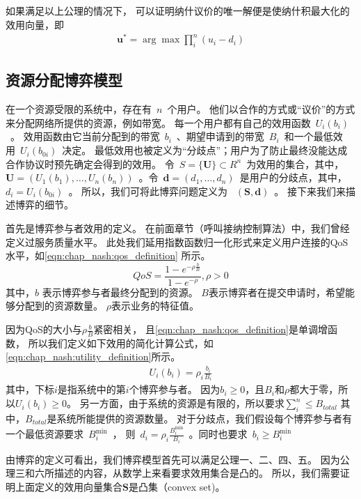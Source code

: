 如果满足以上公理的情况下，
可以证明纳什议价的唯一解便是使纳什积最大化的效用向量\cite{Nash_1950}，即
\begin{align}
\mathbf{u}^* = \arg \max \prod_i^n (u_i-d_i)
\label{eqn:chap_nash:nash_product}
\end{align}

\subsection{资源分配博弈模型}
在一个资源受限的系统中，存在有~$n$~个用户。
他们以合作的方式或“议价”的方式来分配网络所提供的资源，例如带宽。
每一个用户都有自己的效用函数~$U_i(b_i)$~。
效用函数由它当前分配到的带宽~$b_i$~、期望申请到的带宽~$B_i$~和一个最低效用~$U_i(b_{0i})$~决定。
最低效用也被定义为“分歧点”；用户为了防止最终没能达成合作协议时预先确定会得到的效用。
令~$S = \{ \mathbf{U} \} \subset R^n$~为效用的集合，其中，~$\mathbf{U} =(U_1(b_1), \ldots, U_n(b_n))$~。令~$\mathbf{d} = (d_1, \ldots, d_n)$~是用户的分歧点，其中，~$d_i = U_i(b_{0i})$~。
所以，我们可将此博弈问题定义为 ~$(\mathbf{S,d})$~。
接下来我们来描述博弈的细节。

首先是博弈参与者效用的定义。
在前面章节（呼叫接纳控制算法）中，我们曾经定义过服务质量水平。
此处我们延用指数函数归一化形式来定义用户连接的QoS水平，如\eqref{eqn:chap_nash:qos_definition} 所示。
\begin{equation}
QoS = \frac{1- e^{-\rho \frac{b}{B} }}{1-e^{-\rho}}, \rho > 0
\label{eqn:chap_nash:qos_definition}
\end{equation}
其中，$b$ 表示博弈参与者最终分配到的资源。
$B$表示博弈者在提交申请时，希望能够分配到的资源数量。
$\rho$表示业务的特征值。

因为QoS的大小与$\rho \frac{b}{B}$紧密相关，
且\eqref{eqn:chap_nash:qos_definition}是单调增函数，
所以我们定义如下效用的简化计算公式，如 \eqref{eqn:chap_nash:utility_definition}所示。
\begin{align}
    U_i(b_i) = \rho_i \frac{b_i}{B_i}
    \label{eqn:chap_nash:utility_definition}
\end{align}
其中，下标$i$是指系统中的第$i$个博弈参与者。
因为$b_i\ge 0$，且$B_i$和$\rho$都大于零，所以$U_i(b_i)\ge0$。
另一方面，由于系统的资源是有限的，所以要求$\sum_i^n \le B_{total}$
其中，$B_{total}$是系统所能提供的资源数量。
对于分歧点，我们假设每个博弈参与者有一个最低资源要求~$B_i^{\min}$~，
则~$d_i = \rho_i \frac{B_i^{\min}}{B_i}$~。同时也要求~$b_i\ge B_i^{\min}$~

由博弈的定义可看出，我们博弈模型首先可以满足公理一、二、四、五。
因为公理三和六所描述的内容，从数学上来看要求效用集合是凸的。
所以，我们需要证明上面定义的效用向量集合$\mathbf{S}$是凸集（convex set)。

